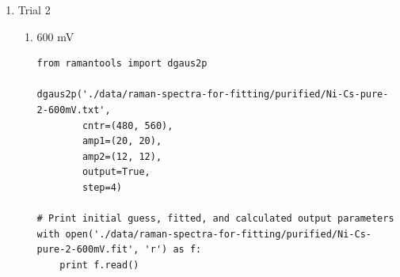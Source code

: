 \documentclass[journal=jpccck,manuscript=suppinfo,email=true]{achemso}
\begin{document}
\begin{enumerate}
\begin{enumerate}
\begin{enumerate}
\item 800 mV
\label{sec-4-1-0-2-1-3}
\begin{verbatim}
from ramantools import dgaus2p

dgaus2p('./data/raman-spectra-for-fitting/purified/Ni-Cs-pure-1-800mV.txt',
        cntr=(480, 560),
        amp1=(25, 25),
        amp2=(20, 20),
        output=True,
        step=4)

# Print initial guess, fitted, and calculated output parameters
with open('./data/raman-spectra-for-fitting/purified/Ni-Cs-pure-1-800mV.fit', 'r') as f:
    print f.read()
\end{verbatim}

\begin{verbatim}
Initial guess parameters:
=========================
                      Peak 1, Peak 2
Peak center =         480.0, 560.00
Amplitude fit 1 =     25.0, 25.00
Amplitude fit 2 =     20.0, 20.00
Standard dev. fit 1 = 10.0, 5.0
Standard dev. fit 2 = 10.0, 5.0

Baseline parameters:
=========================
Slope =               -0.02
Intercept =           24.25

Fitted parameters:
=========================
                      Peak 1, Peak 2
Peak center =         479.75, 555.99
Amplitude fit 1 =     23.84, 27.04
Amplitude fit 2 =     12.69, 19.81
Standard dev. fit 1 = 15.58, 5.65
Standard dev. fit 2 = 33.62, 6.40

Calculation output:
========================
Mean peak 1 =         479.8 $\pm$ 0.13
Mean peak 2 =         556.0 $\pm$ 0.23
Height peak 1 =       66.6 $\pm$ 0.56
Height peak 2 =       46.9 $\pm$ 0.47
Area peak 1 =         1858.8
Area peak 2 =         1959.6
\end{verbatim}
\end{enumerate}

\item Trial 2
\label{sec-4-1-0-2-2}
\begin{enumerate}
\item 600 mV
\label{sec-4-1-0-2-2-1}
\begin{verbatim}
from ramantools import dgaus2p

dgaus2p('./data/raman-spectra-for-fitting/purified/Ni-Cs-pure-2-600mV.txt',
        cntr=(480, 560),
        amp1=(20, 20),
        amp2=(12, 12),
        output=True,
        step=4)

# Print initial guess, fitted, and calculated output parameters
with open('./data/raman-spectra-for-fitting/purified/Ni-Cs-pure-2-600mV.fit', 'r') as f:
    print f.read()
\end{verbatim}


\end{enumerate}
\end{enumerate}
\end{enumerate}
\end{document}
